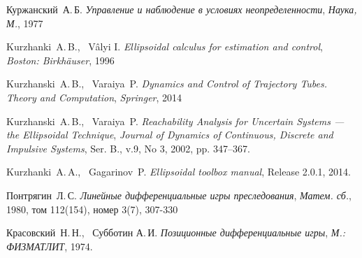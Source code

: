 \begin{thebibliography}{0}

	 Куржанский~А.\,Б. 
	\emph{Управление и наблюдение в условиях неопределенности}, \emph{Наука, М.}, 1977

	 Kurzhanki~A.\,B., \ Vâlyi I.
	\emph{Ellipsoidal calculus for estimation and control}, \emph{Boston: Birkhäuser}, 1996

	 Kurzhanski~A.\,B., \ Varaiya~P. 
	\emph{Dynamics and Control of Trajectory Tubes. Theory and Computation}, \emph{Springer}, 2014

	 Kurzhanski~A.\,B., \ Varaiya~P. 
	\emph{Reachability Analysis for Uncertain Systems — the Ellipsoidal Technique}, \emph{Journal of Dynamics of Continuous, Discrete and Impulsive Systems}, Ser. B., v.9, No 3, 2002, pp. 347–367.

	 Kurzhanki~A.\,A., \ Gagarinov~P. 
	\emph{Ellipsoidal toolbox manual}, Release 2.0.1, 2014.

	 Понтрягин~Л.\,С.
	\emph{Линейные дифференциальные игры преследования}, \emph{Матем. сб.}, 1980, том 112(154), номер 3(7), 307-330

	 Красовский~Н.\,Н., \ Субботин А.\,И.
	\emph{Позиционные дифференциальные игры}, \emph{М.: ФИЗМАТЛИТ}, 1974.

\end{thebibliography}